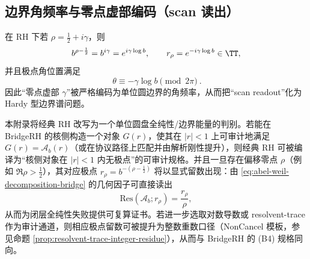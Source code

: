 \subsection{边界角频率与零点虚部编码（scan 读出）}
\label{subsec:abel-boundary-frequency}

在 RH 下若 $\rho=\tfrac12+i\gamma$，则
$$
b^{\rho-\frac12}=b^{i\gamma}=e^{i\gamma\log b},
\qquad
r_\rho=e^{-i\gamma\log b}\in\TT,
$$
并且极点角位置满足
$$
\boxed{\ \theta\equiv -\gamma\log b\pmod{2\pi}\ }.
$$
因此“零点虚部 $\gamma$”被严格编码为单位圆边界的角频率，从而把“scan readout”化为 Hardy 型边界谱问题。

\begin{remark}\label{rem:abel-weil-to-bridge}
本附录将经典 RH 改写为一个单位圆盘全纯性/边界能量的判别。若能在 BridgeRH 的核侧构造一个对象 $G(r)$，使其在 $|r|<1$ 上可审计地满足
$
G(r)=\mathcal A_b(r)
$（或在协议路径上匹配并由解析刚性提升），则经典 RH 可被编译为“核侧对象在 $|r|<1$ 内无极点”的可审计规格。并且一旦存在偏移零点 $\rho$（例如 $\Re\rho>\tfrac12$），其对应极点 $r_\rho=b^{-(\rho-\frac12)}$ 将以显式留数出现：由 \eqref{eq:abel-weil-decomposition-bridge} 的几何因子可直接读出
$$
\mathrm{Res}(\mathcal A_b;r_\rho)=\frac{r_\rho}{\rho},
$$
从而为闭层全纯性失败提供可复算证书。若进一步选取对数导数或 resolvent-trace 作为审计通道，则相应极点留数可被提升为整数重数口径（NonCancel 模板，参见命题 \ref{prop:resolvent-trace-integer-residue}），从而与 BridgeRH 的 (B4) 规格同向。
\end{remark}

